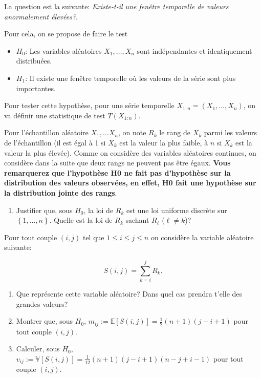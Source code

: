 \documentclass[]{article}
\providecommand{\tightlist}{%
  \setlength{\itemsep}{0pt}\setlength{\parskip}{0pt}}
\begin{document}
La question est la suivante: \emph{Existe-t-il une fenêtre temporelle de
valeurs anormalement élevées?}.

Pour cela, on se propose de faire le test

\begin{itemize}
\tightlist
\item
  \(H_0\): Les variables aléatoires \(X_1,\dots, X_n\) sont
  indépendantes et identiquement distribuées.
\item
  \(H_1\): Il existe une fenêtre temporelle où les valeurs de la série
  sont plus importantes.
\end{itemize}

Pour tester cette hypothèse, pour une série temporelle
\(X_{1:n} = (X_1,\dots, X_n)\), on va définir une statistique de test
\(T(X_{1:n})\).

Pour l'échantillon aléatoire \(X_1,\dots X_n\), on note \(R_k\) le rang
de \(X_k\) parmi les valeurs de l'échantillon (il est égal à 1 si
\(X_k\) est la valeur la plus faible, à \(n\) si \(X_k\) est la valeur
la plus élevée). Comme on considère des variables aléatoires continues,
on considère dans la suite que deux rangs ne peuvent pas être égaux.
\textbf{Vous remarquerez que l'hypothèse H0 ne fait pas d'hypothèse sur
la distribution des valeurs observées, en effet, H0 fait une hypothèse
sur la distribution jointe des rangs}.

\begin{enumerate}
\def\labelenumi{\arabic{enumi}.}
\tightlist
\item
  Justifier que, sous \(H_0\), la loi de \(R_k\) est une loi uniforme
  discrète sur \(\left\lbrace 1,\dots,n\right\rbrace\). Quelle est la
  loi de \(R_k\) sachant \(R_\ell\) (\(\ell\neq k\))?
\end{enumerate}

Pour tout couple \((i, j)\) tel que \(1 \leq i\leq j\leq n\) on
considère la variable aléatoire suivante:

\[S(i, j) = \sum_{k = i}^j R_k.\]

\begin{enumerate}
\def\labelenumi{\arabic{enumi}.}
\setcounter{enumi}{1}
\item
  Que représente cette variable aléatoire? Dans quel cas prendra t'elle
  des grandes valeurs?
\item
  Montrer que, sous \(H_0\),
  \(m_{ij} := \mathbb{E}[S(i,j)] = \frac{1}{2}(n+1)(j-i+1)\) pour tout
  couple \((i,j)\).
\item
  Calculer, sous \(H_0\),
  \(v_{ij} := \mathbb{V}[S(i,j)] = \frac{1}{12}(n+1)(j-i+1)(n-j+i-1)\)
  pour tout couple \((i,j)\).
\end{enumerate}
\end{document}
